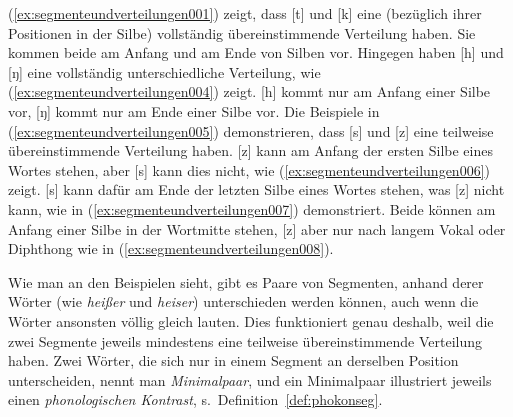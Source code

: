 \begin{exe}
  \ex\label{ex:segmenteundverteilungen001}
    \begin{xlist}
    \end{xlist}
  \ex\label{ex:segmenteundverteilungen005}
    \begin{xlist}
    \end{xlist}
\end{exe}

\Stretch[0.5]

(\ref{ex:segmenteundverteilungen001}) zeigt, dass [t] und [k] eine (bezüglich ihrer Positionen in der Silbe) vollständig übereinstimmende Verteilung haben.
Sie kommen beide am Anfang und am Ende von Silben vor.
Hingegen haben [h] und [ŋ] eine vollständig unterschiedliche  Verteilung, wie (\ref{ex:segmenteundverteilungen004}) zeigt.
[h] kommt nur am Anfang einer Silbe vor, [ŋ] kommt nur am Ende einer Silbe vor.
Die Beispiele in (\ref{ex:segmenteundverteilungen005}) demonstrieren, dass [s] und [z] eine teilweise übereinstimmende Verteilung haben.
[z] kann am Anfang der ersten Silbe eines Wortes stehen, aber [s] kann dies nicht, wie (\ref{ex:segmenteundverteilungen006}) zeigt.
[s] kann dafür am Ende der letzten Silbe eines Wortes stehen, was [z] nicht kann, wie in (\ref{ex:segmenteundverteilungen007}) demonstriert.
Beide können am Anfang einer Silbe in der Wortmitte stehen, [z] aber nur nach langem Vokal oder Diphthong wie in (\ref{ex:segmenteundverteilungen008}).

Wie man an den Beispielen sieht, gibt es Paare von Segmenten, anhand derer Wörter (wie \textit{heißer} und \textit{heiser}) unterschieden werden können, auch wenn die Wörter ansonsten völlig gleich lauten.
Dies funktioniert genau deshalb, weil die zwei Segmente jeweils mindestens eine teilweise übereinstimmende Verteilung haben.
Zwei Wörter, die sich nur in einem Segment an derselben Position unterscheiden, nennt man \textit{Minimalpaar}, und ein Minimalpaar illustriert jeweils einen \textit{phonologischen Kontrast}, s.\ Definition~\ref{def:phokonseg}.

